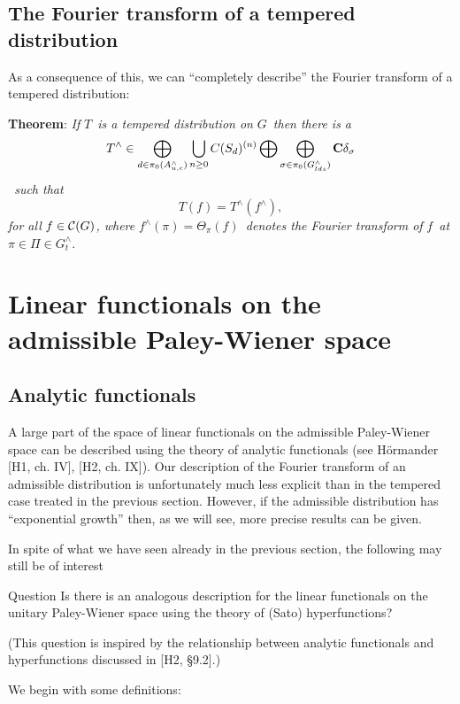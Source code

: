 \subsection{The Fourier transform of a tempered distribution}

As a consequence of this, we can ``completely describe'' the Fourier
transform of a tempered distribution:

{\bf Theorem}: {\em If }$T${\em \ is a tempered distribution on }$G${\em \
then there is a } 
\[
T^{\wedge }\in \bigoplus_{d\in \pi _0(A_{u,c}^{\wedge })}\bigcup_{n\geq
0}C(S_d)^{(n)}\bigoplus \bigoplus_{\sigma \in \pi _0(G_{lds}^{\wedge })}{\bf %
C}\delta _\sigma 
\]
{\em \ such that} 
\[
T(f)=T^{\wedge }(f^{\wedge }), 
\]
{\em for all }$f\in {\cal C}(G)${\em , where }$f^{\wedge }(\pi )=\Theta _\pi
(f)${\em \ denotes the Fourier transform of }$f${\em \ at }$\pi \in \Pi \in
G_t^{\wedge }.$

\section{Linear functionals on the admissible Paley-Wiener space}

\subsection{Analytic functionals}

A large part of the space of linear functionals on the admissible
Paley-Wiener space can be described using the theory of analytic functionals
(see H\"ormander [H1, ch. IV], [H2, ch. IX]). Our description of the Fourier
transform of an admissible distribution is unfortunately much less explicit
than in the tempered case treated in the previous section. However, if the
admissible distribution has ``exponential growth'' then, as we will see,
more precise results can be given.

In spite of what we have seen already in the previous section, the following
may still be of interest

{\sc Question} Is there is an analogous description for the linear
functionals on the unitary Paley-Wiener space using the theory of (Sato)
hyperfunctions?

(This question is inspired by the relationship between analytic functionals
and hyperfunctions discussed in [H2, \S 9.2].)

We begin with some definitions:

